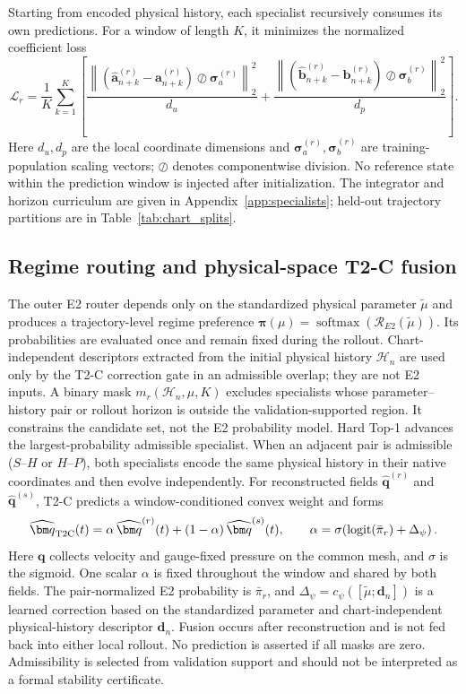 Starting from encoded physical history, each specialist recursively consumes its own
predictions. For a window of length $K$, it minimizes the normalized coefficient loss
\begin{equation}
  \mathcal L_r=\frac{1}{K}\sum_{k=1}^{K}\left[
  \frac{\left\|(\widehat{\bm a}_{n+k}^{(r)}-\bm a_{n+k}^{(r)})
  \oslash\bm\sigma_a^{(r)}\right\|_2^2}{d_u}
  +\frac{\left\|(\widehat{\bm b}_{n+k}^{(r)}-\bm b_{n+k}^{(r)})
  \oslash\bm\sigma_b^{(r)}\right\|_2^2}{d_p}\right].
  \label{eq:main_rollout_loss}
\end{equation}
Here $d_u,d_p$ are the local coordinate dimensions and $\bm\sigma_a^{(r)},
\bm\sigma_b^{(r)}$ are training-population scaling vectors; $\oslash$ denotes
componentwise division. No reference state within the prediction window is injected
after initialization. The integrator and horizon curriculum are given in
Appendix~\ref{app:specialists}; held-out trajectory partitions are in
Table~\ref{tab:chart_splits}.

\subsection{Regime routing and physical-space T2-C fusion}

The outer E2 router depends only on the standardized physical parameter $\widetilde\mu$ and produces a trajectory-level regime preference $\bm\pi(\mu)=\operatorname{softmax}(\mathcal R_{E2}(\widetilde\mu))$. Its probabilities are evaluated once and remain fixed during the rollout. Chart-independent descriptors extracted from the initial physical history $\mathcal H_n$ are used only by the T2-C correction gate in an admissible overlap; they are not E2 inputs.
A binary mask $m_r(\mathcal H_n,\mu,K)$ excludes specialists whose
parameter--history pair or rollout horizon is outside the validation-supported
region. It constrains the candidate set, not the
E2 probability model. Hard Top-1 advances the largest-probability admissible specialist.
When an adjacent pair is admissible ($S$--$H$ or $H$--$P$), both specialists encode the same physical history in their native coordinates and then evolve independently. For reconstructed fields $\widehat{\bm q}^{(r)}$ and $\widehat{\bm q}^{(s)}$, T2-C predicts a window-conditioned convex weight and forms
\begin{equation}
  \widehat{\bm q}_{\rm T2C}(t)
  =\alpha\,\widehat{\bm q}^{(r)}(t)+(1-\alpha)\,\widehat{\bm q}^{(s)}(t),
  \qquad \alpha=\sigma\!\left(\operatorname{logit}(\bar\pi_r)+\Delta_\psi\right).
  \label{eq:main_t2c}
\end{equation}
Here $\bm q$ collects velocity and gauge-fixed pressure on the common mesh, and
$\sigma$ is the sigmoid. One scalar $\alpha$ is fixed throughout the window and
shared by both fields. The pair-normalized E2 probability is $\bar\pi_r$, and
$\Delta_\psi=c_\psi([\widetilde\mu;\bm d_n])$ is a learned correction based on the
standardized parameter and chart-independent physical-history descriptor $\bm d_n$.
Fusion occurs after reconstruction and is not fed back into either local rollout.
No prediction is asserted if all masks are zero. Admissibility is selected from
validation support and should not be interpreted as a formal stability certificate.
